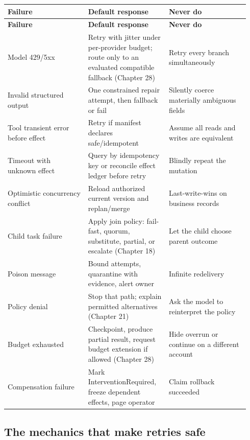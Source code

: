 \BookTableStart
\small
\begin{longtable}{@{}Y{0.3133\linewidth}Y{0.3133\linewidth}Y{0.3133\linewidth}@{}}
\color{white}\bfseries \textbf{Failure} & \color{white}\bfseries \textbf{Default response} & \color{white}\bfseries \textbf{Never do} \\
\endfirsthead
{}
\color{white}\bfseries \textbf{Failure} & \color{white}\bfseries \textbf{Default response} & \color{white}\bfseries \textbf{Never do} \\
\endhead
Model 429/5xx & Retry with jitter under per-provider budget; route only to an evaluated compatible fallback (Chapter 28) & Retry every branch simultaneously \\
Invalid structured output & One constrained repair attempt, then fallback or fail & Silently coerce materially ambiguous fields \\
Tool transient error before effect & Retry if manifest declares safe/idempotent & Assume all reads and writes are equivalent \\
Timeout with unknown effect & Query by idempotency key or reconcile effect ledger before retry & Blindly repeat the mutation \\
Optimistic concurrency conflict & Reload authorized current version and replan/merge & Last-write-wins on business records \\
Child task failure & Apply join policy: fail-fast, quorum, substitute, partial, or escalate (Chapter 18) & Let the child choose parent outcome \\
Poison message & Bound attempts, quarantine with evidence, alert owner & Infinite redelivery \\
Policy denial & Stop that path; explain permitted alternatives (Chapter 21) & Ask the model to reinterpret the policy \\
Budget exhausted & Checkpoint, produce partial result, request budget extension if allowed (Chapter 28) & Hide overrun or continue on a different account \\
Compensation failure & Mark InterventionRequired, freeze dependent effects, page operator & Claim rollback succeeded \\
\end{longtable}
\BookTableEnd

\subsection{The mechanics that make retries safe}

